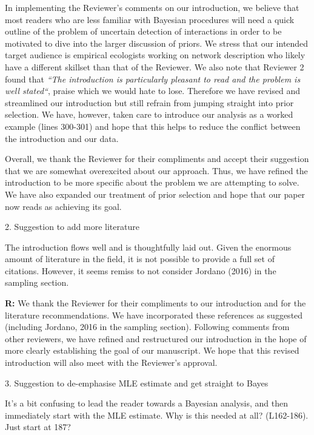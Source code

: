 \documentclass[12pt]{letter}
\newenvironment{refquote}{\bigskip \begin{it}}{\end{it}\smallskip}
\begin{document}
		In implementing the Reviewer's comments on our introduction, we believe that most readers who are less familiar with Bayesian procedures will need a quick outline of the problem of uncertain detection of interactions in order to be motivated to dive into the larger discussion of priors. We stress that our intended target audience is empirical ecologists working on network description who likely have a different skillset than that of the Reviewer. We also note that Reviewer 2 found that \emph{``The introduction is particularly pleasant to read and the problem is well stated``}, praise which we would hate to lose. Therefore we have revised and streamlined our introduction but still refrain from jumping straight into prior selection. We have, however, taken care to introduce our analysis as a worked example (lines 300-301) and hope that this helps to reduce the conflict between the introduction and our data. 


		Overall, we thank the Reviewer for their compliments and accept their suggestion that we are somewhat overexcited about our approach. Thus, we have refined the introduction to be more specific about the problem we are attempting to solve. We have also expanded our treatment of prior selection and hope that our paper now reads as achieving its goal.


	2. Suggestion to add more literature


		\begin{refquote}
		The introduction flows well and is thoughtfully laid out. Given the enormous amount of literature in the field, it is not possible to provide a full set of citations. However, it seems remiss to not consider Jordano (2016) in the sampling section.
		\end{refquote}


		\textbf{R:} We thank the Reviewer for their compliments to our introduction and for the literature recommendations. We have incorporated these references as suggested (including Jordano, 2016 in the sampling section). Following comments from other reviewers, we have refined and restructured our introduction in the hope of more clearly establishing the goal of our manuscript. We hope that this revised introduction will also meet with the Reviewer's approval. 


	3. Suggestion to de-emphasise MLE estimate and get straight to Bayes


		\begin{refquote}
		It's a bit confusing to lead the reader towards a Bayesian analysis, and then immediately start with the MLE estimate. Why is this needed at all? (L162-186). Just start at 187?
		\end{refquote}
\end{document}
